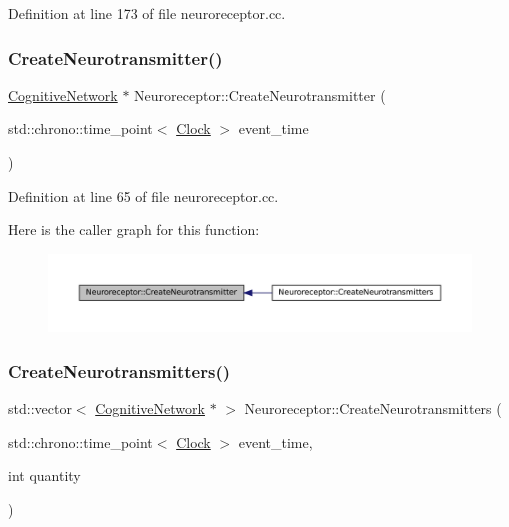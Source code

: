 Definition at line 173 of file neuroreceptor.\+cc.

\mbox{\label{class_neuroreceptor_af671059884336eadbc367f9d8556eb3f}} 
\subsubsection{\texorpdfstring{Create\+Neurotransmitter()}{CreateNeurotransmitter()}}
{\footnotesize\ttfamily \mbox{\hyperlink{class_cognitive_network}{Cognitive\+Network}} $\ast$ Neuroreceptor\+::\+Create\+Neurotransmitter (\begin{DoxyParamCaption}\item[{std\+::chrono\+::time\+\_\+point$<$ \mbox{\hyperlink{universe_8h_a0ef8d951d1ca5ab3cfaf7ab4c7a6fd80}{Clock}} $>$}]{event\+\_\+time }\end{DoxyParamCaption})}



Definition at line 65 of file neuroreceptor.\+cc.

Here is the caller graph for this function\+:\nopagebreak
\begin{figure}[H]
\begin{center}
\leavevmode
\includegraphics[width=350pt]{class_neuroreceptor_af671059884336eadbc367f9d8556eb3f_icgraph}
\end{center}
\end{figure}
\mbox{\label{class_neuroreceptor_aa0037379ecb214ff982429e054f2a194}} 
\subsubsection{\texorpdfstring{Create\+Neurotransmitters()}{CreateNeurotransmitters()}}
{\footnotesize\ttfamily std\+::vector$<$ \mbox{\hyperlink{class_cognitive_network}{Cognitive\+Network}} $\ast$ $>$ Neuroreceptor\+::\+Create\+Neurotransmitters (\begin{DoxyParamCaption}\item[{std\+::chrono\+::time\+\_\+point$<$ \mbox{\hyperlink{universe_8h_a0ef8d951d1ca5ab3cfaf7ab4c7a6fd80}{Clock}} $>$}]{event\+\_\+time,  }\item[{int}]{quantity }\end{DoxyParamCaption})}




